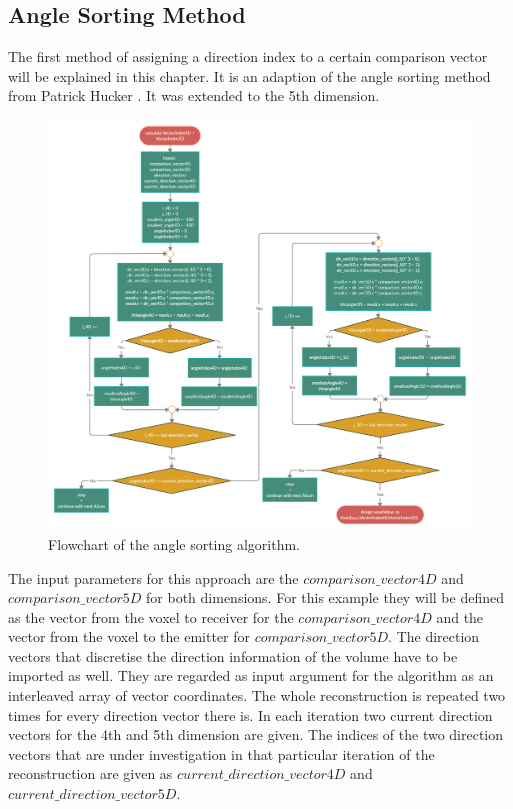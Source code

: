\subsection{Angle Sorting Method}
\label{chap:angle_sorting}
The first method of assigning a direction index to a certain comparison vector will be explained in this chapter. It is an adaption of the angle sorting method from Patrick Hucker \cite{PatrickHucker2014EvaluationRuckstreumodells}. It was extended to the 5th dimension.



\begin{figure}[H]
    \centering
    \includegraphics[width=1.12\textwidth]{Graphics/Angle_Sorting.png}
    \caption{Flowchart of the angle sorting algorithm.}
    \label{angle_sorting_flow}
\end{figure}

The input parameters for this approach are the $comparison\_vector4D$ and $comparison\_vector5D$ for both dimensions.
For this example they will be defined as the vector from the voxel to receiver for the $comparison\_vector4D$ and the vector from the voxel to the emitter for  $comparison\_vector5D$.
The direction vectors that discretise the direction information of the volume have to be imported as well. They are regarded as input argument for the algorithm as an interleaved array of vector coordinates. 
The whole reconstruction is repeated two times for every direction vector there is. In each iteration two current direction vectors for the 4th and 5th dimension are given. The indices of the two direction vectors that are under investigation in that particular iteration of the reconstruction are given as $current\_direction\_vector4D$ and $current\_direction\_vector5D$.

